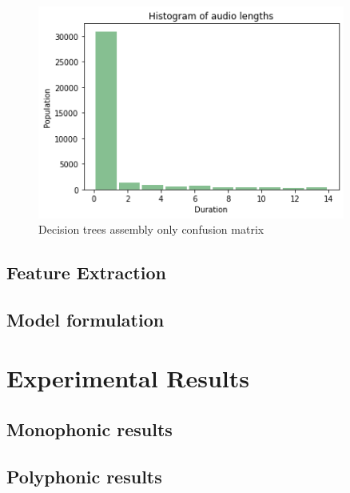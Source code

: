\documentclass{article}
\begin{document}
\begin{figure}[H]
	\centering
	\includegraphics[width=0.9\textwidth]{./images/poly/duration.png}	
	\caption{Decision trees assembly only confusion matrix}
	\label{fig:poly_duration}
\end{figure}

\subsection{Feature Extraction}
\label{subsec:poly_feature}

\subsection{Model formulation}
\label{subsec:poly_model}




\section{Experimental Results}
\label{sec:results}

\subsection{Monophonic results}
\label{subsec:mono_results}

\subsection{Polyphonic results}
\label{subsec:poly_results}
\end{document}

